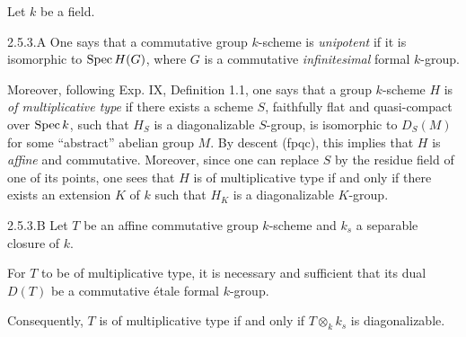 Let $k$ be a field.
\begin{definition}{2.5.3.A}\label{VIIB.2.5.3.A}
One says that a commutative group $k$-scheme is \emph{unipotent} if it is isomorphic to $\operatorname{Spec} H(G)$, where $G$ is a commutative \emph{infinitesimal} formal $k$-group.
\end{definition}
Moreover, following Exp. IX, Definition 1.1, one says that a group $k$-scheme $H$ is \emph{of multiplicative type} if there exists a scheme $S$, faithfully flat and quasi-compact over $\operatorname{Spec} k$, such that $H_S$ is a diagonalizable $S$-group, \ie is isomorphic to $D_S(M)$ for some ``abstract'' abelian group $M$. By descent (fpqc), this implies that $H$ is \emph{affine} and commutative. Moreover, since one can replace $S$ by the residue field of one of its points, one sees that $H$ is of multiplicative type if and only if there exists an extension $K$ of $k$ such that $H_K$ is a diagonalizable $K$-group.
\begin{proposition}{2.5.3.B}\label{VIIB.2.5.3.B}
Let $T$ be an affine commutative group $k$-scheme and $k_s$ a separable closure of $k$.
\begin{enumeratei}
\item For $T$ to be of multiplicative type, it is necessary and sufficient that its dual $D(T)$ be a commutative étale formal $k$-group.
\item Consequently, $T$ is of multiplicative type if and only if $T\otimes_k k_s$ is diagonalizable.
\end{enumeratei}
\end{proposition}
